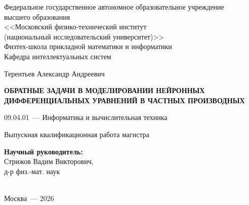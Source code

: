 \begin{center}
Федеральное государственное автономное образовательное учреждение\\ высшего образования\\
<<Московский физико-технический институт\\
(национальный исследовательский университет)>>\\
Физтех-школа прикладной математики и информатики\\
Кафедра интеллектуальных систем
\end{center}
%
\vspace{0pt plus5fill}
%
\begin{center}
\large{Терентьев Александр Андреевич}
\end{center}
%
\vspace{0pt}
%
\begin{center}
\textbf{\large\MakeUppercase{Обратные задачи в моделировании нейронных дифференциальных уравнений в частных производных}}
\end{center}
%
\vspace{0pt}
%
\begin{center}
09.04.01~--- Информатика и вычислительная техника
\end{center}
%
\vspace{0pt}
%
\begin{center}
Выпускная квалификационная работа магистра
\end{center}
%
\vspace{0pt plus2fill}
%
\begin{center}
\hfill\parbox{8,4cm}{\textbf{Научный руководитель:}\\
Стрижов Вадим Викторович,\\
д-р физ.-мат. наук}\\
\vspace{0pt plus4fill}
Москва~--- 2026
\end{center}